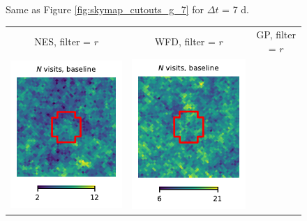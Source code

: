 \documentclass[preprintm,linenumbers]{aastex631}
\begin{document}
\begin{figure}
\begin{tabular}{  c c c}
			\end{tabular}
			\caption{
   Same as Figure \ref{fig:skymap_cutouts_g_7} for $\Delta t$ = 7 d. 
    }
	\label{fig:_skymap_cutouts_g_7}
		\end{figure}

  
  	\begin{figure}
			\centering
			\begin{tabular}{  c c c}
                 NES, filter = $r$ & WFD, filter = $r$ & GP, filter = $r$ \\
				\includegraphics{results/skymaps_cutout/skymaps_cutout_first_year_one_snap_v4_0_10yrs_db_noDD_noTwi_nside-256_CountMetric_r_NES_noDD_noTwi.pdf} &
				\includegraphics{results/skymaps_cutout/skymaps_cutout_first_year_one_snap_v4_0_10yrs_db_noDD_noTwi_nside-256_CountMetric_r_WFD_noDD_noTwi.pdf} &

\end{tabular}
\end{figure}
\end{document}
